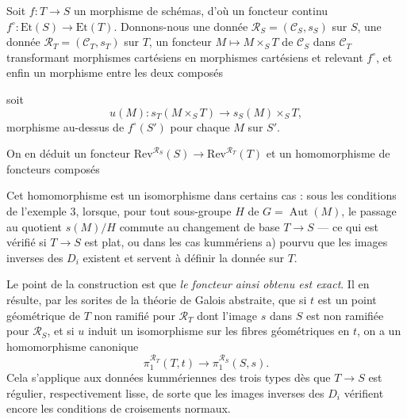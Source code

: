 \documentclass[11pt,a4paper]{article}
\begin{document}
Soit $f : T \to S$ un morphisme de schémas, d'où un foncteur continu
$f^{\circ} : \mathrm{Et}(S) \to \mathrm{Et}(T)$. Donnons-nous une donnée
$\mathcal{R}_{S} = (\mathcal{C}_{S}, s_{S})$ sur $S$, une donnée
$\mathcal{R}_{T} = (\mathcal{C}_{T}, s_{T})$ sur $T$, un foncteur
$M \mapsto M \times_{S} T$ de $\mathcal{C}_{S}$ dans $\mathcal{C}_{T}$
transformant morphismes cartésiens en morphismes cartésiens et relevant
$f^{\circ}$, et enfin un morphisme entre les deux composés


soit
\[
  u(M) : s_{T}(M \times_{S} T) \longrightarrow s_{S}(M) \times_{S} T ,
\]
morphisme au-dessus de $f^{\circ}(S')$ pour chaque $M$ sur $S'$.

On en déduit un foncteur
$\mathrm{Rev}^{\mathcal{R}_{S}}(S) \to \mathrm{Rev}^{\mathcal{R}_{T}}(T)$ et un
homomorphisme de foncteurs composés


Cet homomorphisme est un isomorphisme dans certains cas : sous les conditions
de l'exemple 3, lorsque, pour tout sous-groupe $H$ de
$G = \operatorname{Aut}(M)$, le passage au quotient $s(M)/H$ commute au
changement de base $T \to S$ --- ce qui est vérifié si $T \to S$ est plat, ou
dans les cas kummériens a) pourvu que les images inverses des $D_{i}$ existent
et servent à définir la donnée sur $T$.

Le point de la construction est que \emph{le foncteur ainsi obtenu est exact}.
Il en résulte, par les sorites de la théorie de Galois abstraite, que si $t$
est un point géométrique de $T$ non ramifié pour $\mathcal{R}_{T}$ dont l'image
$s$ dans $S$ est non ramifiée pour $\mathcal{R}_{S}$, et si $u$ induit un
isomorphisme sur les fibres géométriques en $t$, on a un homomorphisme
canonique
\[
  \pi_{1}^{\mathcal{R}_{T}}(T, t) \longrightarrow
  \pi_{1}^{\mathcal{R}_{S}}(S, s) .
\]
Cela s'applique aux données kummériennes des trois types dès que $T \to S$ est
régulier, respectivement lisse, de sorte que les images inverses des $D_{i}$
vérifient encore les conditions de croisements normaux.
\end{document}
